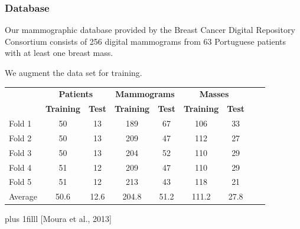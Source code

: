 \documentclass{beamer}
\newcommand{\source}[1]{\vskip0pt plus 1filll \scriptsize #1}
\begin{document}
    \begin{frame}
        \frametitle{Database}
        Our mammographic database provided by the Breast Cancer Digital Repository Consortium consists of 256 digital mammograms from 63 Portuguese patients with at least one breast mass. %
        
        We augment the data set for training.
        \small
        \begin{table}[h]
	        \centering
	        \begin{tabular}{lcccccccc}
		        \hline
		        & \multicolumn{2}{c}{\textbf{Patients}} & \multicolumn{2}{c}{\textbf{Mammograms}} &\multicolumn{2}{c}{\textbf{Masses}}\\
		        & \textbf{Training} & \textbf{Test} & \textbf{Training} & \textbf{Test} & \textbf{Training} & \textbf{Test} \\
		        \hline 
		        Fold 1	&50	&13	&189	&67	&106	&33\\
		        Fold 2	&50	&13	&209	&47	&112	&27\\
		        Fold 3	&50	&13	&204	&52	&110	&29\\
		        Fold 4	&51	&12	&209	&47	&110	&29\\
		        Fold 5	&51	&12 &213	&43	&118	&21\\
		        Average &50.6 &12.6 &204.8 &51.2 &111.2 &27.8\\
		        \hline
	        \end{tabular}
        \end{table}
        \source[Moura et al., 2013]
    \end{frame}
    
\end{document}
